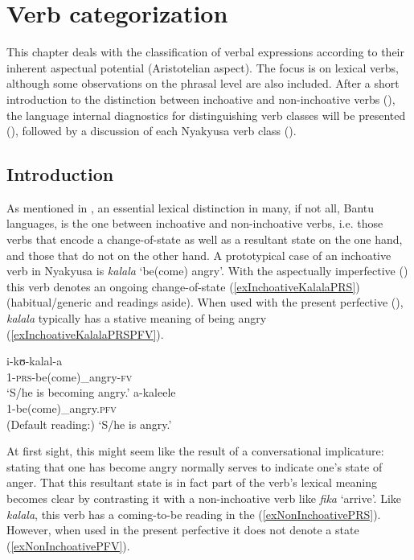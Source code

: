 \chapter{Verb categorization}\label{AspectualClassification}
This chapter deals with the classification of verbal expressions according to their inherent aspectual potential (Aristotelian aspect). The focus is on lexical verbs, although some observations on the phrasal level are also included. After a short introduction to the distinction between inchoative and non-inchoative verbs (), the language internal diagnostics for distinguishing verb classes will be presented (), followed by a discussion of each Nyakyusa verb class ().
\section{Introduction}\label{InchoativeNonInchoative}
As mentioned in , an essential lexical distinction in many, if not all, Bantu languages, is the one between inchoative and non-inchoative verbs, i.e. those verbs that encode a change-of-state as well as a resultant state on the one hand, and those that do not on the other hand. A prototypical case of an inchoative verb in Nyakyusa is \textit{kalala} \lq be(come) angry'. With the aspectually imperfective  () this verb denotes an ongoing change-of-state (\ref{exInchoativeKalalaPRS}) (habitual/generic and  readings aside). When used with the present perfective (), \textit{kalala} typically has a stative meaning of being angry (\ref{exInchoativeKalalaPRSPFV}).

\begin{exe}
\ex \label{exInchoativeKalalaPRS}\gll i-kʊ-kalal-a\\
1-\textsc{prs}-be(come)\_angry-\textsc{fv}\\
\glt `S/he is becoming angry.'
\ex \label{exInchoativeKalalaPRSPFV} \gll a-kaleele\\
1-be(come)\_angry.\textsc{pfv}\\
\glt (Default reading:) \lq S/he is angry.'
\end{exe}

At first sight, this might seem like the result of a conversational implicature: stating that one has become angry normally serves to indicate one's state of anger. That this resultant state is in fact part of the verb's lexical meaning becomes clear by contrasting it with a non-inchoative verb like \textit{fika} \lq arrive'. Like \textit{kalala}, this verb has a coming-to-be reading in the  (\ref{exNonInchoativePRS}). However, when used in the present perfective it does not denote a state (\ref{exNonInchoativePFV}).

